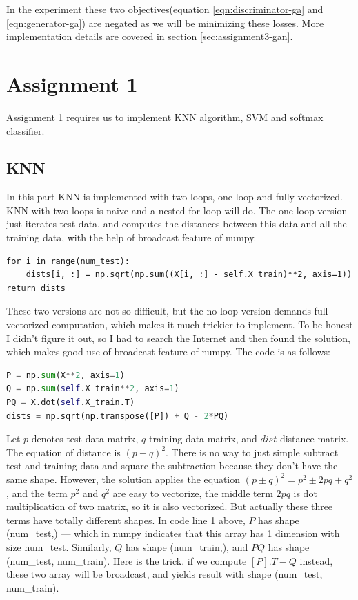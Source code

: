 \documentclass{article} %
\begin{document}
In the experiment these two objectives(equation \ref{eqn:discriminator-ga} and \ref{eqn:generator-ga}) are negated as we will be minimizing these losses. More implementation details are covered in section \ref{sec:assignment3-gan}.

\section{Assignment 1}
Assignment 1 requires us to implement KNN algorithm, SVM and softmax classifier.
\subsection{KNN}
In this part KNN is implemented with two loops, one loop and fully vectorized. KNN with two loops is naive and a nested for-loop will do. The one loop version just iterates test data, and computes the distances between this data and all the training data, with the help of broadcast feature of numpy.
\begin{lstlisting}
for i in range(num_test):
	dists[i, :] = np.sqrt(np.sum((X[i, :] - self.X_train)**2, axis=1))
return dists
\end{lstlisting}

These two versions are not so difficult, but the no loop version demands full vectorized computation, which makes it much trickier to implement. To be honest I didn't figure it out, so I had to search the Internet and then found the solution, which makes good use of broadcast feature of numpy. The code is as follows:
\begin{lstlisting}[language=python]
P = np.sum(X**2, axis=1)
Q = np.sum(self.X_train**2, axis=1)
PQ = X.dot(self.X_train.T)
dists = np.sqrt(np.transpose([P]) + Q - 2*PQ)
\end{lstlisting}
Let $p$ denotes test data matrix, $q$ training data matrix, and $dist$ distance matrix. The equation of distance is $(p-q)^2$. There is no way to just simple subtract test and training data and square the subtraction because they don't have the same shape. However, the solution applies the equation $(p\pm q)^2=p^2 \pm 2pq + q^2$, and the term $p^2$ and $q^2$ are easy to vectorize, the middle term $2pq$ is dot multiplication of two matrix, so it is also vectorized. But actually these three terms have totally different shapes. In code line 1 above, $P$ has shape (num\_test,) --- which in numpy indicates that this array has 1 dimension with size num\_test. Similarly, $Q$ has shape (num\_train,), and $PQ$ has shape (num\_test, num\_train). Here is the trick. if we compute $[P].T-Q$ instead, these two array will be broadcast, and yields result with shape (num\_test, num\_train).
\end{document}
